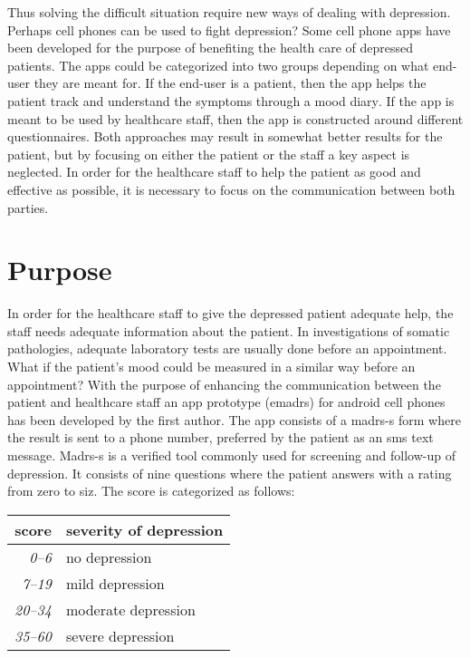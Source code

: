 \documentclass[12pt,a4paper,oneside]{article}
\renewcommand{\_}{\hspace{0.1cm}}
\let\oldcite\cite
\renewcommand*\cite[1]{\textsuperscript{\oldcite{#1}}}
\begin{document}
Thus solving the difficult situation require new ways of dealing with depression. Perhaps cell phones can be used to fight depression? Some cell phone apps have been developed for the purpose of benefiting the health care of depressed patients. The apps could be categorized into two groups depending on what end-user they are meant for. If the end-user is a patient, then the app helps the patient track and understand the symptoms through a mood diary\cite{app1}. If the app is meant to be used by healthcare staff, then the app is constructed around different questionnaires\cite{app2}. Both approaches may result in somewhat better results for the patient, but by focusing on either the patient or the staff a key aspect is neglected. In order for the healthcare staff to help the patient as good and effective as possible, it is necessary to focus on the communication between both parties.

\section*{Purpose}
In order for the healthcare staff to give the depressed patient adequate help, the staff needs adequate information about the patient. In investigations of somatic pathologies, adequate laboratory tests are usually done before an appointment. What if the patient's mood could be measured in a similar way before an appointment? With the purpose of enhancing the communication between the patient and healthcare staff an app prototype (e{\sc madrs}) for android cell phones has been developed by the first author\cite{emadrs1, emadrs2}. The app consists of a {\sc madrs-s} form where the result is sent to a phone number, preferred by the patient as an {\sc sms} text message. {\sc Madrs-s} is a verified tool commonly used for screening and follow-up of depression\cite{madrs2,madrs3}. It consists of nine questions where the patient answers with a rating from zero to siz. The score is categorized as follows:\\

\begin{tabular}{r|l}
{\bf score} & {\bf severity of depression}\\
\hline{\it 0--6} &  no depression\\
{\it 7--19} & mild depression\\
{\it 20--34} & moderate depression\\
{\it 35--60} & severe depression\\
\end{tabular}\\\\
\end{document}
